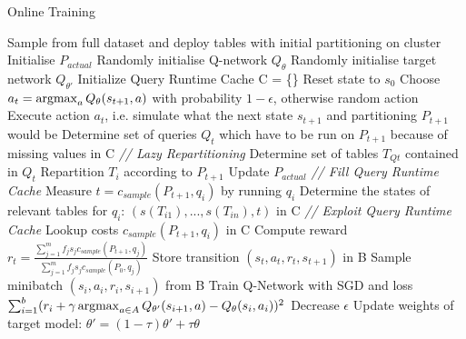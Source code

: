 \begin{algorithm}
    \begin{algorithmic}[1]
        \caption{Online Training} \label{algorithm:online-training}
        \State Sample from full dataset and deploy tables with initial partitioning on cluster
        \State Initialise $P_{actual}$
        \State Randomly initialise Q-network $Q_\theta$
        \State Randomly initialise target network $Q_{\theta'}$
        \State Initialize Query Runtime Cache C = \{\}
         
            \State Reset state to $s_0$
             
                \State Choose $a_t = \operatorname*{argmax}_a Q_\theta(s_{t+1},a)$ with probability $1-\epsilon$, otherwise random action
                \State Execute action $a_t$, i.e. simulate what the next state $s_{t+1}$ and partitioning $P_{t+1}$ would be
                \State Determine set of queries $Q_t$ which have to be run on $P_{t+1}$ because of missing values in C
                \State \textit{// Lazy Repartitioning}
                \State Determine set of tables $T_{Qt}$ contained in $Q_t$
                        \State Repartition $T_i$ according to $P_{t+1}$
                        \State Update $P_{actual}$
                    \EndIf 
                    \State \textit{// Fill Query Runtime Cache}
                \EndFor
                    \State Measure $t = c_{sample}(P_{t+1},q_i)$ by running $q_i$
                    \State Determine the states of relevant tables for $q_i$:
                    \State $(s(T_{i1}),...,s(T_{in}),t)$ in C
                \EndFor
                \State \textit{// Exploit Query Runtime Cache}
                \State Lookup costs $c_{sample}(P_{t+1},q_i)$ in C
                \State Compute reward $r_t = \frac{\sum^m_{j=1} f_js_jc_{sample}(P_{t+1},q_j)}{\sum^m_{j=1} f_js_jc_{sample}(P_0,q_j)}$
                \State Store transition $(s_t, a_t, r_t, s_{t+1})$ in B
                \State Sample minibatch $(s_i, a_i, r_i, s_{i+1})$ from B
                \State Train Q-Network with SGD and loss
            \EndFor
            \State $\sum^b_{i=1}(r_i + \gamma \operatorname*{argmax}_{a \in A} Q_{\theta'} (s_{i+1},a) - Q_\theta (s_i, a_i))^2$
            \State Decrease $\epsilon$
            \State Update weights of target model: $\theta' = (1-\tau)\theta' + \tau \theta$
        \EndFor
    \end{algorithmic}
\end{algorithm}

